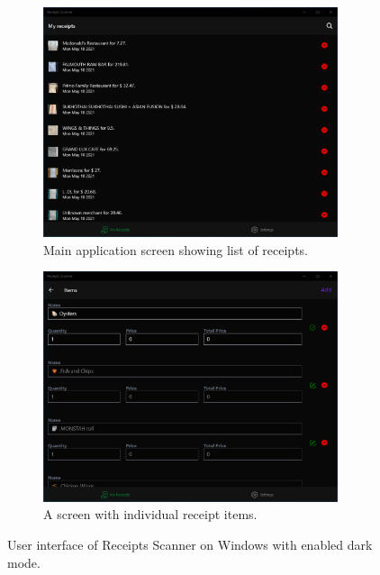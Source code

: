 \documentclass[
  digital, %
  table,   %
  oneside, %
  lof,     %
  lot,     %
]{fithesis3}
\begin{document}
\begin{figure}
    \centering
    \begin{subfigure}[t]{0.5\textwidth}
      \centering
      \includegraphics[width=0.95\textwidth]{figures/screens/windows/dark/receipts_list}
      \caption{Main application screen showing list of receipts.}
    \end{subfigure}
    \begin{subfigure}[t]{0.5\textwidth}
      \centering
      \includegraphics[width=0.95\textwidth]{figures/screens/windows/dark/items}
      \caption{A screen with individual receipt items.}
      \label{fig:dark_mode_windows}
    \end{subfigure}
    \caption{User interface of Receipts Scanner on Windows with enabled dark mode.}
\end{figure}
\end{document}
